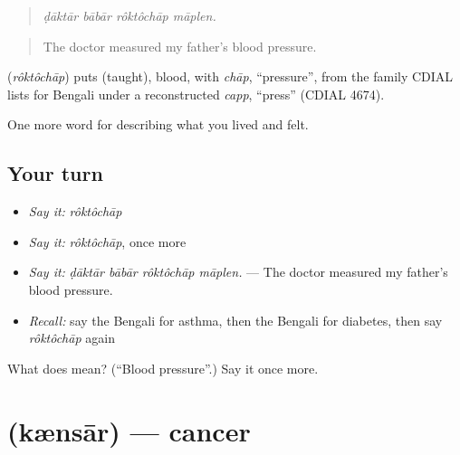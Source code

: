 \begin{quote}
   
\end{quote}

\begin{quote}
\emph{ḍāktār bābār rôktôchāp māplen.}
\end{quote}

\begin{quote}
The doctor measured my father's blood pressure.
\end{quote}

\begin{cousinweb}
\textbf{} (\emph{rôktôchāp}) puts  (taught), blood, with \emph{chāp}, \textquotedblleft{}pressure\textquotedblright{}, from the family CDIAL lists for Bengali under a reconstructed \emph{capp}, \textquotedblleft{}press\textquotedblright{} (CDIAL 4674).
\end{cousinweb}

\begin{grammarlens}[title={What you've built}]
One more word for describing what you lived and felt.
\end{grammarlens}

\subsection*{Your turn}
\begin{itemize}
\raggedright
  \item \emph{Say it:} \emph{rôktôchāp}
  \item \emph{Say it:} \emph{rôktôchāp}, once more
  \item \emph{Say it:} \emph{ḍāktār bābār rôktôchāp māplen.} — The doctor measured my father's blood pressure.
  \item \emph{Recall:} say the Bengali for asthma, then the Bengali for diabetes, then say \emph{rôktôchāp} again
\end{itemize}

\begin{tcolorbox}[breakable,colback=teal!4,colframe=teal!35!black,title={Before you move on}]
What does  mean? (\textquotedblleft{}Blood pressure\textquotedblright{}.) Say it once more.
\end{tcolorbox}
\section[\texorpdfstring{\bn{ক্যানসার} (kænsār)}{ক্যানসার (kænsār)}]{ (kænsār) — cancer}

